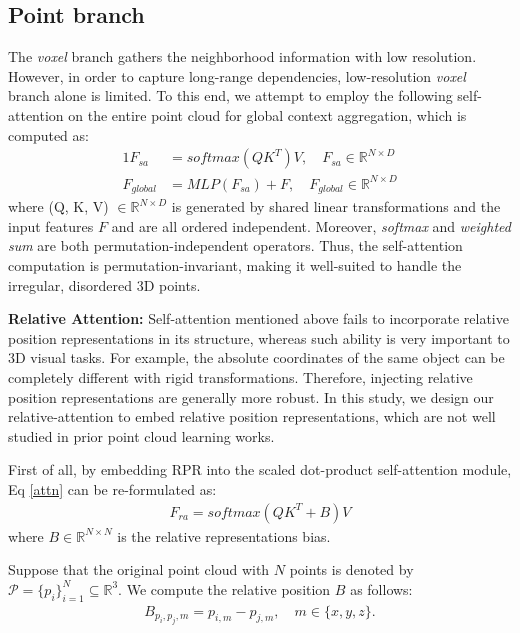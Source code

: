 \documentclass[10pt,twocolumn,letterpaper]{article}
\begin{document}
\subsection{Point branch}\label{3.2}
The \emph{voxel} branch gathers the neighborhood information with low resolution. However, in order to capture long-range dependencies, low-resolution \emph{voxel} branch alone is limited. To this end, we attempt to employ the following self-attention on the entire point cloud for global context aggregation, which is computed as:
\begin{alignat}{1}
F_{sa} &= softmax(QK^T) V, \quad F_{sa}\in \mathbb{R}^{N\times D} \label{attn}\\
F_{global} &= MLP(F_{sa})+F,\quad F_{global}\in \mathbb{R}^{N\times D} 
\end{alignat}
where (Q, K, V) $\in \mathbb{R}^{N\times D}$ is generated by shared linear transformations and the input features $F$ and are all ordered independent. Moreover, \emph{softmax} and \emph{weighted sum} are both permutation-independent operators. Thus, the self-attention computation is permutation-invariant, making it well-suited to handle the irregular, disordered 3D points.

\textbf{Relative Attention:} Self-attention mentioned above fails to incorporate relative position representations in its structure, whereas such ability is very important to 3D visual tasks. For example, the absolute coordinates of the same object can be completely different with rigid transformations. Therefore, injecting relative position representations are generally more robust.
In this study, we design our relative-attention to embed relative position representations, which are not well studied in prior point cloud learning works.

First of all, by embedding RPR into the scaled dot-product self-attention module, Eq \ref{attn} can be re-formulated as:
\begin{align}
    F_{ra} = softmax(QK^{T}+B)V
\label{bias}
\end{align}
where $B\in \mathbb{R}^{N\times N}$ is the relative representations bias. 

Suppose that the original point cloud with $N$ points is denoted by $\mathcal{P}= \{p_i\}_{i=1}^N \subseteq \mathbb{R}^3 $. We compute the relative position $B$ as follows:
\begin{align}
    B_{p_i,p_j,m} = p_{i,m}-p_{j,m}, \quad m \in \{x,y,z\}.
\end{align}
\end{document}
